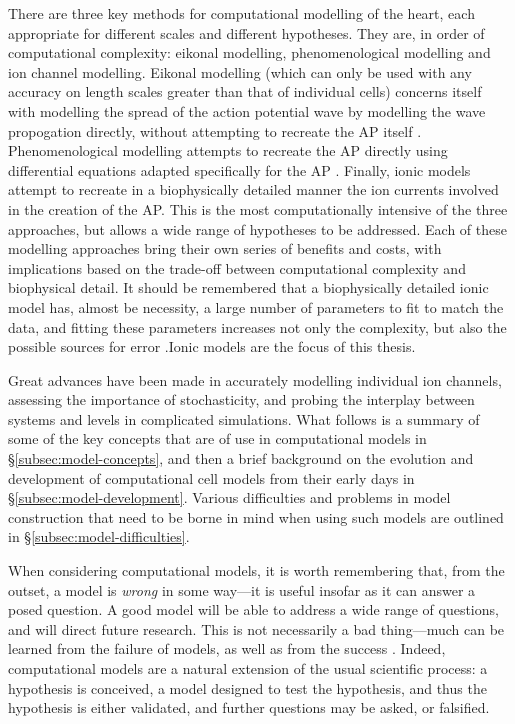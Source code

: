 \documentclass[../thesis-main.tex]{subfiles}
\begin{document}
 There are three key methods for computational modelling of the heart, each appropriate for different scales and different hypotheses. They are, in order of computational complexity: eikonal modelling, phenomenological modelling and ion channel modelling. Eikonal modelling (which can only be used with any accuracy on length scales greater than that of individual cells) concerns itself with modelling the spread of the action potential wave by modelling the wave propogation directly, without attempting to recreate the AP itself \citep{Keener2009}. Phenomenological modelling attempts to recreate the AP directly using differential equations adapted specifically for the AP \citep{Bueno-Orovio2008}. Finally, ionic models attempt to recreate in a biophysically detailed manner the ion currents involved in the creation of the AP. This is the most computationally intensive of the three approaches, but allows a wide range of hypotheses to be addressed. Each of these modelling approaches bring their own series of benefits and costs, with implications based on the trade-off between computational complexity and biophysical detail. It should be remembered that a biophysically detailed ionic model has, almost be necessity, a large number of parameters to fit to match the data, and fitting these parameters increases not only the complexity, but also the possible sources for error \citep{Relan2011}.Ionic models are the focus of this thesis.
 
 Great advances have been made in accurately modelling individual ion channels, assessing the importance of stochasticity, and probing the interplay between systems and levels in complicated simulations. What follows is a summary of some of the key concepts that are of use in computational models in \S\ref{subsec:model-concepts}, and then a brief background on the evolution and development of computational cell models from their early days in \S\ref{subsec:model-development}. Various difficulties and problems in model construction that need to be borne in mind when using such models are outlined in \S\ref{subsec:model-difficulties}.
 
 When considering computational models, it is worth remembering that, from the outset, a model is \emph{wrong} in some way---it is useful insofar as it can answer a posed question. A good model will be able to address a wide range of questions, and will direct future research. This is not necessarily a bad thing---much can be learned from the failure of models, as well as from the success \citep{Noble2001, Quinn2013}. Indeed, computational models are a natural extension of the usual scientific process: a hypothesis is conceived, a model designed to test the hypothesis, and thus the hypothesis is either validated, and further questions may be asked, or falsified.
 
\end{document}

